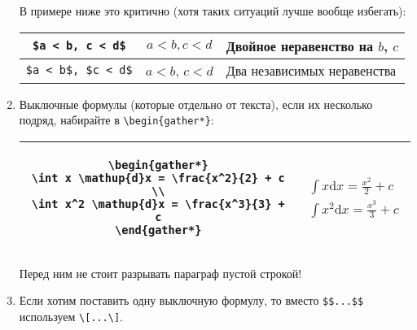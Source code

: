 \documentclass[12pt,a4paper]{book}
\def\d{\mathup{d}}
\begin{document}
\begin{enumerate}
	В примере ниже это критично (хотя таких ситуаций лучше вообще избегать):
	\begin{center}\begin{tabular}{|c|c|l|}
		\hline \verb!$a < b, c < d$! & $a < b, c < d$ & Двойное неравенство на $b$, $c$ \\
		\hline \verb!$a < b$, $c < d$! & $a < b$, $c < d$ & Два независимых неравенства \\
	\hline
	\end{tabular}\end{center}

\item
	Выключные формулы (которые отдельно от текста), если их несколько подряд, набирайте в \verb'\begin{gather*}':
	\begin{center}\begin{tabular}{|c|c|}
	\hline
		\begin{minipage}{8cm}
			\begin{verbatim}
\begin{gather*}
\int x \d x = \frac{x^2}{2} + c \\
\int x^2 \d x = \frac{x^3}{3} + c
\end{gather*}
\end{verbatim}
		\end{minipage}
		&
		\begin{minipage}{8cm}
			\begin{gather*}
				\int x \d x = \frac{x^2}{2} + c \\
				\int x^2 \d x = \frac{x^3}{3} + c
			\end{gather*}
		\end{minipage} \\
		\hline
	\end{tabular}\end{center}

	Перед ним не стоит разрывать параграф пустой строкой!

\item 
	Если хотим поставить одну выключную формулу, то вместо \verb!$$...$$! используем \verb!\[...\]!.


\end{enumerate}
\end{document}
